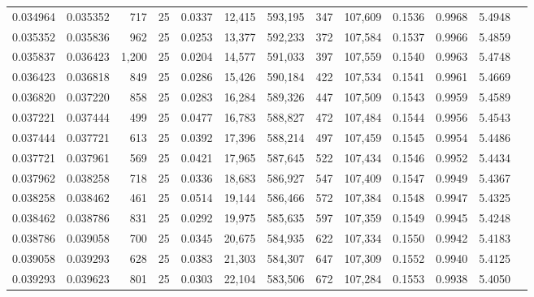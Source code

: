 \begin{tabular}{rrrrrrrrrrrrr}
0.034964 & 0.035352 &   717 &  25 &                                     0.0337 &  12,415 & 593,195 &     347 & 107,609 & 0.1536 & 0.9968 & 5.4948 \\
0.035352 & 0.035836 &   962 &  25 &                                     0.0253 &  13,377 & 592,233 &     372 & 107,584 & 0.1537 & 0.9966 & 5.4859 \\
0.035837 & 0.036423 & 1,200 &  25 &                                     0.0204 &  14,577 & 591,033 &     397 & 107,559 & 0.1540 & 0.9963 & 5.4748 \\
0.036423 & 0.036818 &   849 &  25 &                                     0.0286 &  15,426 & 590,184 &     422 & 107,534 & 0.1541 & 0.9961 & 5.4669 \\
0.036820 & 0.037220 &   858 &  25 &                                     0.0283 &  16,284 & 589,326 &     447 & 107,509 & 0.1543 & 0.9959 & 5.4589 \\
0.037221 & 0.037444 &   499 &  25 &                                     0.0477 &  16,783 & 588,827 &     472 & 107,484 & 0.1544 & 0.9956 & 5.4543 \\
0.037444 & 0.037721 &   613 &  25 &                                     0.0392 &  17,396 & 588,214 &     497 & 107,459 & 0.1545 & 0.9954 & 5.4486 \\
0.037721 & 0.037961 &   569 &  25 &                                     0.0421 &  17,965 & 587,645 &     522 & 107,434 & 0.1546 & 0.9952 & 5.4434 \\
0.037962 & 0.038258 &   718 &  25 &                                     0.0336 &  18,683 & 586,927 &     547 & 107,409 & 0.1547 & 0.9949 & 5.4367 \\
0.038258 & 0.038462 &   461 &  25 &                                     0.0514 &  19,144 & 586,466 &     572 & 107,384 & 0.1548 & 0.9947 & 5.4325 \\
0.038462 & 0.038786 &   831 &  25 &                                     0.0292 &  19,975 & 585,635 &     597 & 107,359 & 0.1549 & 0.9945 & 5.4248 \\
0.038786 & 0.039058 &   700 &  25 &                                     0.0345 &  20,675 & 584,935 &     622 & 107,334 & 0.1550 & 0.9942 & 5.4183 \\
0.039058 & 0.039293 &   628 &  25 &                                     0.0383 &  21,303 & 584,307 &     647 & 107,309 & 0.1552 & 0.9940 & 5.4125 \\
0.039293 & 0.039623 &   801 &  25 &                                     0.0303 &  22,104 & 583,506 &     672 & 107,284 & 0.1553 & 0.9938 & 5.4050 \\

\end{tabular}
